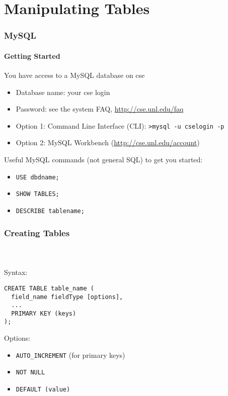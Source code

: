 \documentclass{beamer}
\begin{document}
\section{Manipulating Tables}

\begin{frame}[fragile]
  \frametitle{MySQL}
  \framesubtitle{Getting Started}

You have access to a MySQL database on cse
\begin{itemize}
  \item Database name: your cse login
  \item Password: see the system FAQ, \url{http://cse.unl.edu/faq}
  \item Option 1: Command Line Interface (CLI):
	\texttt{>mysql -u cselogin -p}
  \item Option 2: MySQL Workbench (\url{http://cse.unl.edu/account})
\end{itemize}

Useful MySQL commands (not general SQL) to get you started:

\begin{itemize}
  \item \texttt{USE dbdname;}
  \item \texttt{SHOW TABLES;}
  \item \texttt{DESCRIBE tablename;}
\end{itemize}

\end{frame}

\begin{frame}[fragile]
  \frametitle{Creating Tables}
  \framesubtitle{~}

Syntax:
\begin{verbatim}
CREATE TABLE table_name (
  field_name fieldType [options],
  ...
  PRIMARY KEY (keys)
);
\end{verbatim}

Options:
\begin{itemize}
  \item \texttt{AUTO_INCREMENT} (for primary keys)
  \item \texttt{NOT NULL}
  \item \texttt{DEFAULT (value)}
\end{itemize}

\end{frame}
\end{document}
